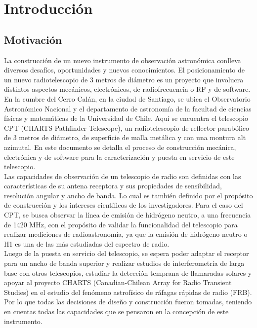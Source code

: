 \chapter{Introducción}
\section{Motivación}

La construcción de un nuevo instrumento de observación astronómica conlleva diversos desafíos, oportunidades y nuevos conocimientos. El posicionamiento de un nuevo radiotelescopio de 3 metros de diámetro es un proyecto que involucra distintos aspectos mecánicos, electrónicos, de radiofrecuencia o RF y de software.\\


En la cumbre del Cerro Calán, en la ciudad de Santiago, se ubica el Observatorio Astronómico Nacional y el departamento de astronomía de la facultad de ciencias físicas y matemáticas de la Universidad de Chile. Aquí se encuentra el telescopio CPT (CHARTS Pathfinder Telescope), un radiotelescopio de reflector parabólico de 3 metros de diámetro, de superficie de malla metálica y con una montura alt azimutal. En este documento se detalla el proceso de construcción mecánica, electrónica y de software para la caracterización y puesta en servicio de este telescopio.\\ 

Las capacidades de observación de un telescopio de radio son definidas con las características de su antena receptora y sus propiedades de sensibilidad, resolución angular y ancho de banda. Lo cual es también definido por el propósito de construcción y los intereses científicos de los investigadores. Para el caso del CPT, se busca observar la línea de emisión de hidrógeno neutro, a una frecuencia de 1420 MHz, con el propósito de validar la funcionalidad del telescopio para realizar mediciones de radioastronomía, ya que la emisión de hidrógeno neutro o H1 es una de las más estudiadas del espectro de radio.\\

Luego de la puesta en servicio del telescopio, se espera poder adaptar el receptor para un ancho de banda superior y realizar estudios de interferometría de larga base con otros telescopios, estudiar la detección temprana de llamaradas solares y apoyar al proyecto CHARTS (Canadian-Chilean Array for Radio Transient Studies) en el estudio del fenómeno astrofísico de ráfagas rápidas de radio (FRB). Por lo que todas las decisiones de diseño y construcción fueron tomadas, teniendo en cuentas todas las capacidades que se pensaron en la concepción de este instrumento.\\

